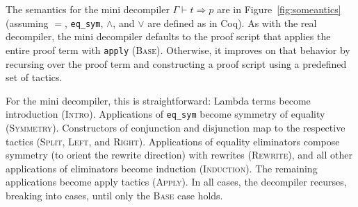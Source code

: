 The semantics for the mini decompiler $\Gamma \vdash t \Rightarrow p$ are in Figure~\ref{fig:someantics} (assuming $=$, \lstinline{eq_sym}, $\wedge$, and $\vee$ are defined as in Coq).
As with the real decompiler, the mini decompiler defaults to the proof script
that applies the entire proof term with \lstinline{apply} (\textsc{Base}).
Otherwise, it improves on that behavior by recursing over the proof term and constructing a proof script using a predefined set of tactics.

\iffalse
\begin{figure*}
\begin{minipage}{0.48\textwidth}
\begin{lstlisting}
fun (@\codesimb{(y0 : list A)}@) =>(@\vspace{-0.04cm}@)
  (@\codesima{list\_rect}@) _ _  (fun (@\codesima{a l H}@) =>(@\vspace{-0.04cm}@)
    (@\codesimc{eq\_ind\_r}@) _ (@\codesimd{eq\_refl}@) (@\codesimc{(app\_nil\_r (rev l) (a::[]))}@))(@\vspace{-0.04cm}@)
    (@\codesime{eq\_refl}@)(@\vspace{-0.04cm}@)
    (@\codesima{y0}@)(@\vspace{-0.04cm}@)
\end{lstlisting}
\end{minipage}
\begin{minipage}{0.48\textwidth}
\begin{lstlisting}
(@\vspace{-0.14cm}@)
- (@\codesimb{intro y0.}@) (@\codesima{induction y0 as [a l H|].}@)(@\vspace{-0.04cm}@)
  + (@\codesimc{simpl. rewrite app\_nil\_r.}@) (@\codesimd{auto.}@)(@\vspace{-0.04cm}@)
  + (@\codesime{auto.}@)(@\vspace{-0.04cm}@)
(@\vspace{-0.14cm}@)
\end{lstlisting}
\end{minipage}
\vspace{-0.3cm}
\caption{Proof term (left) and decompiled proof script (right) for the base case of 
\lstinline{rev_app_distr} (Section~\ref{sec:overview}),  with corresponding terms and tactics 
grouped by color and number.}
\label{fig:rainbow}
\end{figure*}
\fi

For the mini decompiler, this is straightforward: Lambda terms become introduction (\textsc{Intro}).
Applications of \lstinline{eq_sym} become symmetry of equality (\textsc{Symmetry}).
Constructors of conjunction and disjunction map to the respective tactics (\textsc{Split}, \textsc{Left}, and \textsc{Right}).
Applications of equality eliminators compose symmetry (to orient the rewrite direction) with rewrites (\textsc{Rewrite}),
and all other applications of eliminators become induction (\textsc{Induction}).
The remaining applications become apply tactics (\textsc{Apply}).
In all cases, the decompiler recurses, breaking into cases, until only the \textsc{Base}
case holds. %

